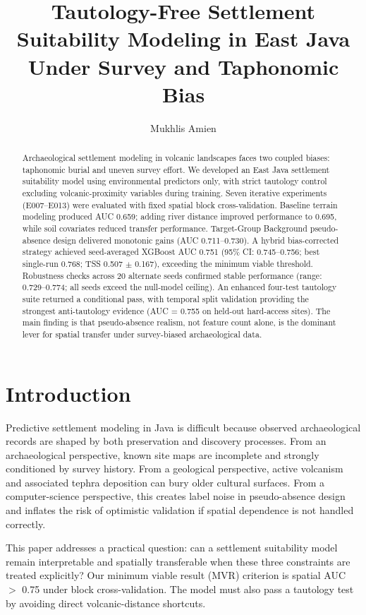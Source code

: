 \documentclass{article}
\title{Tautology-Free Settlement Suitability Modeling in East Java Under Survey and Taphonomic Bias}
\author[1*]{Mukhlis Amien}
\affil[1]{Lab Data Sains, Universitas Bhinneka Nusantara, Indonesia.}
\affil[*]{Address correspondence to: amien@ubhinus.ac.id}
\date{}
\begin{document}
\maketitle

\begin{abstract}
Archaeological settlement modeling in volcanic landscapes faces two coupled biases: taphonomic burial and uneven survey effort. We developed an East Java settlement suitability model using environmental predictors only, with strict tautology control excluding volcanic-proximity variables during training. Seven iterative experiments (E007--E013) were evaluated with fixed spatial block cross-validation. Baseline terrain modeling produced AUC 0.659; adding river distance improved performance to 0.695, while soil covariates reduced transfer performance. Target-Group Background pseudo-absence design delivered monotonic gains (AUC 0.711--0.730). A hybrid bias-corrected strategy achieved seed-averaged XGBoost AUC 0.751 (95\% CI: 0.745--0.756; best single-run 0.768; TSS 0.507 $\pm$ 0.167), exceeding the minimum viable threshold. Robustness checks across 20 alternate seeds confirmed stable performance (range: 0.729--0.774; all seeds exceed the null-model ceiling). An enhanced four-test tautology suite returned a conditional pass, with temporal split validation providing the strongest anti-tautology evidence (AUC = 0.755 on held-out hard-access sites). The main finding is that pseudo-absence realism, not feature count alone, is the dominant lever for spatial transfer under survey-biased archaeological data.
\end{abstract}

\section{Introduction}

Predictive settlement modeling in Java is difficult because observed archaeological records are shaped by both preservation and discovery processes.
From an archaeological perspective, known site maps are incomplete and strongly conditioned by survey history.
From a geological perspective, active volcanism and associated tephra deposition can bury older cultural surfaces.
From a computer-science perspective, this creates label noise in pseudo-absence design and inflates the risk of optimistic validation if spatial dependence is not handled correctly.

This paper addresses a practical question: can a settlement suitability model remain interpretable and spatially transferable when these three constraints are treated explicitly?
Our minimum viable result (MVR) criterion is spatial AUC $>$ 0.75 under block cross-validation.
The model must also pass a tautology test by avoiding direct volcanic-distance shortcuts.
\end{document}
